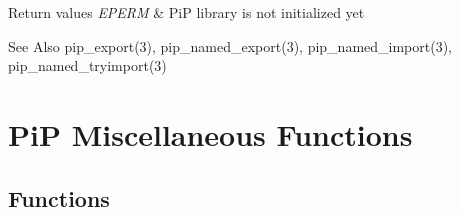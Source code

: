 \documentclass[twoside]{book}
\begin{document}
\begin{DoxyRetVals}{Return values}
{\em E\-P\-E\-R\-M} & Pi\-P library is not initialized yet\\
\hline
\end{DoxyRetVals}
\begin{DoxySeeAlso}{See Also}
pip\-\_\-export(3), pip\-\_\-named\-\_\-export(3), pip\-\_\-named\-\_\-import(3), pip\-\_\-named\-\_\-tryimport(3) 
\end{DoxySeeAlso}
 \hypertarget{group__pip-5-misc}{\section{Pi\-P Miscellaneous Functions}
\label{group__pip-5-misc}
}
\subsection*{Functions}
\end{document}
